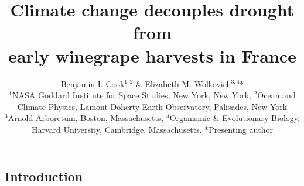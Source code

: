 \documentclass[portrait,a0,final] {a0poster} %
\title{Climate change decouples drought from \\early winegrape harvests in France}
\author{Benjamin I. Cook\(^{1,2}\) \& Elizabeth M. Wolkovich\(^{3, 4}\)* \\ $^{1}$NASA Goddard Institute for Space Studies, New York, New York, $^{2}$Ocean and Climate Physics, Lamont-Doherty Earth Observatory, Palisades, New York\\$^{3}$Arnold Arboretum, Boston, Massachusetts, $^{4}$Organismic \& Evolutionary Biology, Harvard University, Cambridge, Massachusetts. *Presenting author}
\begin{document}
\hspace{-3cm}								%
\colorbox{boxcol}{							%
\begin{minipage}{841mm}					%
\begin{center}
\maketitle
\end{center}
\end{minipage}}
\vspace{1cm}

\begin{multicols}{2}							%
\raggedcolumns


\section*{Introduction}


\end{multicols}
\end{document}
